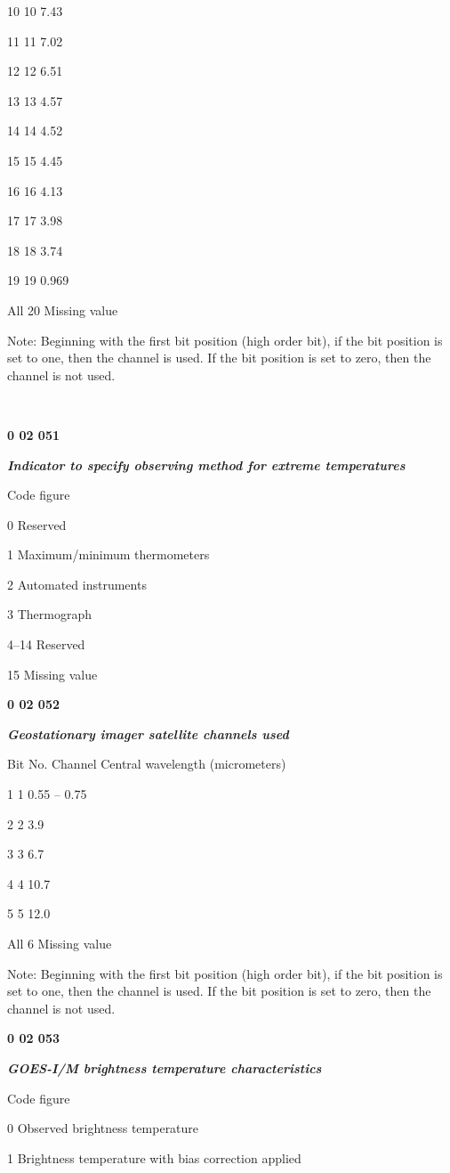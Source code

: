 10 10 7.43

11 11 7.02

12 12 6.51

13 13 4.57

14 14 4.52

15 15 4.45

16 16 4.13

17 17 3.98

18 18 3.74

19 19 0.969

All 20 Missing value

Note: Beginning with the first bit position (high order bit), if the bit position is set to one, then the channel is used. If the bit position is set to zero, then the channel is not used.

\textbf{\\
}

\textbf{0 02 051}

\emph{\textbf{Indicator to specify observing method for extreme temperatures}}

Code figure

0 Reserved

1 Maximum/minimum thermometers

2 Automated instruments

3 Thermograph

4--14 Reserved

15 Missing value

\textbf{0 02 052}

\emph{\textbf{Geostationary imager satellite channels used}}

Bit No. Channel Central wavelength (micrometers)

1 1 0.55 -- 0.75

2 2 3.9

3 3 6.7

4 4 10.7

5 5 12.0

All 6 Missing value

Note: Beginning with the first bit position (high order bit), if the bit position is set to one, then the channel is used. If the bit position is set to zero, then the channel is not used.

\textbf{0 02 053}

\emph{\textbf{GOES-I/M brightness temperature characteristics}}

Code figure

0 Observed brightness temperature

1 Brightness temperature with bias correction applied

